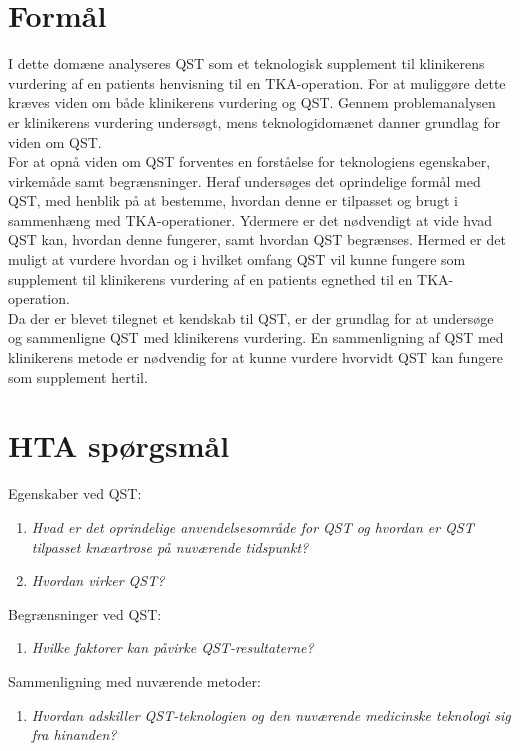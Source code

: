 \section{Formål} 
I dette domæne analyseres QST som et teknologisk supplement til klinikerens vurdering af en patients henvisning til en TKA-operation. For at muliggøre dette kræves viden om både klinikerens vurdering og QST. Gennem problemanalysen er klinikerens vurdering undersøgt, mens teknologidomænet danner grundlag for viden om QST.\\
For at opnå viden om QST forventes en forståelse for teknologiens egenskaber, virkemåde samt begrænsninger. Heraf undersøges det oprindelige formål med QST, med henblik på at bestemme, hvordan denne er tilpasset og brugt i sammenhæng med TKA-operationer. Ydermere er det nødvendigt at vide hvad QST kan, hvordan denne fungerer, samt hvordan QST begrænses. Hermed er det muligt at vurdere hvordan og i hvilket omfang QST vil kunne fungere som supplement til klinikerens vurdering af en patients egnethed til en TKA-operation.\\
Da der er blevet tilegnet et kendskab til QST, er der grundlag for at undersøge og sammenligne QST med klinikerens vurdering. En sammenligning af QST med klinikerens metode er nødvendig for at kunne vurdere hvorvidt QST kan fungere som supplement hertil. 

\section{HTA spørgsmål}
Egenskaber ved QST:
\begin{enumerate}
	\item \textit{Hvad er det oprindelige anvendelsesområde for QST og hvordan er QST tilpasset knæartrose på nuværende tidspunkt?} %
	\item \textit{Hvordan virker QST?}  %
\end{enumerate}
Begrænsninger ved QST:
\begin{enumerate}[resume]
	\item \textit{Hvilke faktorer kan påvirke QST-resultaterne?}
\end{enumerate}
Sammenligning med nuværende metoder:
\begin{enumerate}[resume]
	\item \textit{Hvordan adskiller QST-teknologien og den nuværende medicinske teknologi sig fra hinanden?} %
\end{enumerate}

